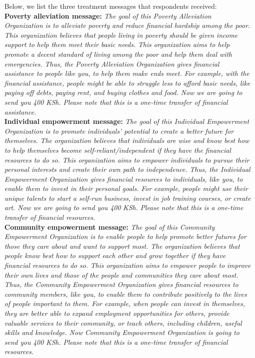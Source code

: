 \documentclass[11pt, a4paper]{article}\usepackage[]{graphicx}\usepackage[]{color}
\begin{document}
        Below, we list the three treatment messages that respondents received: \\

        \textbf{Poverty alleviation message:} \textit{The goal of this Poverty Alleviation Organization is to alleviate poverty and reduce financial hardship among the poor. This organization believes that people living in poverty should be given income support to help them meet their basic needs. This organization aims to help promote a decent standard of living among the poor and help them deal with emergencies. Thus, the Poverty Alleviation Organization gives financial assistance to people like you, to help them make ends meet. For example, with the financial assistance, people might be able to struggle less to afford basic needs, like paying off debts, paying rent, and buying clothes and food. Now we are going to send you 400 KSh. Please note that this is a one-time transfer of financial assistance.} \\

        \textbf{Individual empowerment message:} \textit{The goal of this Individual Empowerment Organization is to promote individuals' potential to create a better future for themselves.  The organization believes that individuals are wise and know best how to help themselves become self-reliant/independent if they have the financial resources to do so. This organization aims to empower individuals to pursue their personal interests and create their own path to independence. Thus, the Individual Empowerment Organization gives financial resources to individuals, like you, to enable them to invest in their personal goals. For example, people might use their unique talents to start a self-run business, invest in job training courses, or create art. Now we are going to send you 400 KSh. Please note that this is a one-time transfer of financial resources.} \\

        \textbf{Community empowerment message:} \textit{The goal of this Community Empowerment Organization is to enable people to help promote better futures for those they care about and want to support most. The organization believes that people know best how to support each other and grow together if they have financial resources to do so. This organization aims to empower people to improve their own lives and those of the people and communities they care about most. Thus, the Community Empowerment Organization gives financial resources to community members, like you, to enable them to contribute positively to the lives of people important to them. For example, when people can invest in themselves, they are better able to expand employment opportunities for others, provide valuable services to their community, or teach others, including children, useful skills and knowledge. Now Community Empowerment Organization is going to send you 400 KSh. Please note that this is a one-time transfer of financial resources.} \\
\end{document}
